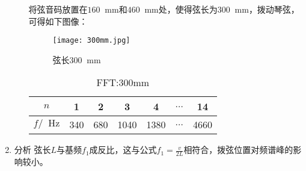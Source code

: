 \documentclass[11pt]{article}
\newcommand*{\unit}[1]{\mathop{}\!\mathrm{#1}}
\newcommand{\mm}{\unit{mm}}
\begin{document}
\begin{enumerate}
\begin{enumerate}
		将弦音码放置在\(160\unit{mm}\)和\(460\mm\)处，使得弦长为\(300\mm\)，拨动琴弦，可得如下图像：
		\begin{figure}[H]
			\centering
			\texttt{[image: 300mm.jpg]}
			\caption{弦长\(300\mm\)}
			\label{fig:300mm}
		\end{figure}	
		\begin{table}[H]
			\centering
			\begin{tabular}{|c|c|c|c|c|c|c|}
				\hline
				\(n\) & 1     & 2     & 3     & 4 & \(\dots\)     & 14     \\ \hline
				\(f/\unit{Hz}\) & 340 & 680 & 1040 & 1380 & \(\dots\) & 4660 \\ \hline
			\end{tabular}
			\caption{FFT:300mm}
			\label{FFT:300mm}
		\end{table}
	\end{enumerate}
	\item 分析 \newline
	 弦长$L$与基频\(f_1\)成反比，这与公式\(f_1=\frac{v}{2L}\)相符合，拨弦位置对频谱峰的影响较小。
	
\end{enumerate}
\end{document}
